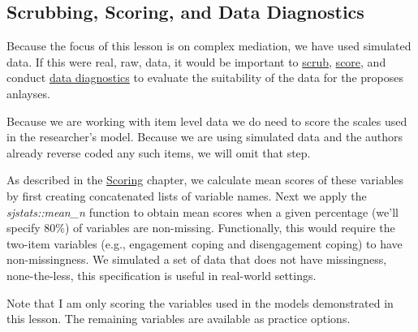 \documentclass[
  11pt,
]{book}
\begin{document}
\hypertarget{scrubbing-scoring-and-data-diagnostics-1}{%
\subsection{Scrubbing, Scoring, and Data Diagnostics}\label{scrubbing-scoring-and-data-diagnostics-1}}

Because the focus of this lesson is on complex mediation, we have used simulated data. If this were real, raw, data, it would be important to \href{https://lhbikos.github.io/ReC_MultivModel/scrub.html}{scrub}, \href{https://lhbikos.github.io/ReC_MultivModel/score.html}{score}, and conduct \href{https://lhbikos.github.io/ReC_MultivModel/DataDx.html}{data diagnostics} to evaluate the suitability of the data for the proposes anlayses.

Because we are working with item level data we do need to score the scales used in the researcher's model. Because we are using simulated data and the authors already reverse coded any such items, we will omit that step.

As described in the \href{https://lhbikos.github.io/ReC_MultivModel/score.html}{Scoring} chapter, we calculate mean scores of these variables by first creating concatenated lists of variable names. Next we apply the \emph{sjstats::mean\_n} function to obtain mean scores when a given percentage (we'll specify 80\%) of variables are non-missing. Functionally, this would require the two-item variables (e.g., engagement coping and disengagement coping) to have non-missingness. We simulated a set of data that does not have missingness, none-the-less, this specification is useful in real-world settings.

Note that I am only scoring the variables used in the models demonstrated in this lesson. The remaining variables are available as practice options.
\end{document}
